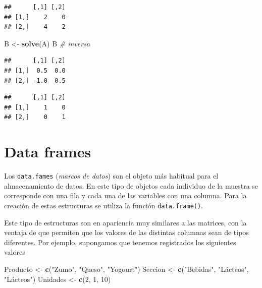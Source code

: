 \documentclass[]{book}
\newenvironment{Shaded}{\begin{snugshade}}{\end{snugshade}}
\newcommand{\KeywordTok}[1]{\textcolor[rgb]{0.13,0.29,0.53}{\textbf{#1}}}
\newcommand{\DecValTok}[1]{\textcolor[rgb]{0.00,0.00,0.81}{#1}}
\newcommand{\StringTok}[1]{\textcolor[rgb]{0.31,0.60,0.02}{#1}}
\newcommand{\CommentTok}[1]{\textcolor[rgb]{0.56,0.35,0.01}{\textit{#1}}}
\newcommand{\OperatorTok}[1]{\textcolor[rgb]{0.81,0.36,0.00}{\textbf{#1}}}
\newcommand{\NormalTok}[1]{#1}
\begin{document}
\begin{verbatim}
##      [,1] [,2]
## [1,]    2    0
## [2,]    4    2
\end{verbatim}

\begin{Shaded}
\begin{Highlighting}[]
\NormalTok{B <-}\StringTok{ }\KeywordTok{solve}\NormalTok{(A)}
\NormalTok{B  }\CommentTok{# inversa}
\end{Highlighting}
\end{Shaded}

\begin{verbatim}
##      [,1] [,2]
## [1,]  0.5  0.0
## [2,] -1.0  0.5
\end{verbatim}

\begin{Shaded}
\end{Shaded}

\begin{verbatim}
##      [,1] [,2]
## [1,]    1    0
## [2,]    0    1
\end{verbatim}

\section{Data frames}\label{data-frames}

Los \texttt{data.fames} (\emph{marcos de datos}) son el objeto más
habitual para el almacenamiento de datos. En este tipo de objetos cada
individuo de la muestra se corresponde con una fila y cada una de las
variables con una columna. Para la creación de estas estructuras se
utiliza la función \texttt{data.frame()}.

Este tipo de estructuras son en apariencia muy similares a las matrices,
con la ventaja de que permiten que los valores de las distintas columnas
sean de tipos diferentes. Por ejemplo, supongamos que tenemos
registrados los siguientes valores

\begin{Shaded}
\begin{Highlighting}[]
\NormalTok{Producto <-}\StringTok{ }\KeywordTok{c}\NormalTok{(}\StringTok{"Zumo"}\NormalTok{, }\StringTok{"Queso"}\NormalTok{, }\StringTok{"Yogourt"}\NormalTok{)}
\NormalTok{Seccion <-}\StringTok{ }\KeywordTok{c}\NormalTok{(}\StringTok{"Bebidas"}\NormalTok{, }\StringTok{"Lácteos"}\NormalTok{, }\StringTok{"Lácteos"}\NormalTok{)}
\NormalTok{Unidades <-}\StringTok{ }\KeywordTok{c}\NormalTok{(}\DecValTok{2}\NormalTok{, }\DecValTok{1}\NormalTok{, }\DecValTok{10}\NormalTok{)}
\end{Highlighting}
\end{Shaded}
\end{document}
